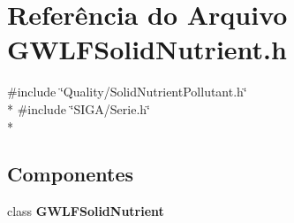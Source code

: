 \section{Referência do Arquivo G\+W\+L\+F\+Solid\+Nutrient.\+h}
\label{_g_w_l_f_solid_nutrient_8h}
{\ttfamily \#include \char`\"{}Quality/\+Solid\+Nutrient\+Pollutant.\+h\char`\"{}}\\*
{\ttfamily \#include \char`\"{}S\+I\+G\+A/\+Serie.\+h\char`\"{}}\\*
\subsection*{Componentes}
\begin{DoxyCompactItemize}
\item 
class {\bf G\+W\+L\+F\+Solid\+Nutrient}
\end{DoxyCompactItemize}
